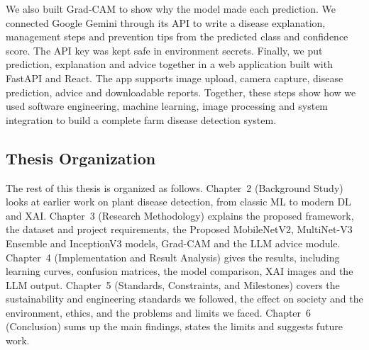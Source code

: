 We also built Grad-CAM to show why the model made each prediction. We connected Google Gemini through its API to write a disease explanation, management steps and prevention tips from the predicted class and confidence score. The API key was kept safe in environment secrets. Finally, we put prediction, explanation and advice together in a web application built with FastAPI and React. The app supports image upload, camera capture, disease prediction, advice and downloadable reports. Together, these steps show how we used software engineering, machine learning, image processing and system integration to build a complete farm disease detection system.

\subsection{Thesis Organization}
The rest of this thesis is organized as follows. Chapter~2 (Background Study) looks at earlier work on plant disease detection, from classic ML to modern DL and XAI. Chapter~3 (Research Methodology) explains the proposed framework, the dataset and project requirements, the Proposed MobileNetV2, MultiNet-V3 Ensemble and InceptionV3 models, Grad-CAM and the LLM advice module. Chapter~4 (Implementation and Result Analysis) gives the results, including learning curves, confusion matrices, the model comparison, XAI images and the LLM output. Chapter~5 (Standards, Constraints, and Milestones) covers the sustainability and engineering standards we followed, the effect on society and the environment, ethics, and the problems and limits we faced. Chapter~6 (Conclusion) sums up the main findings, states the limits and suggests future work.
